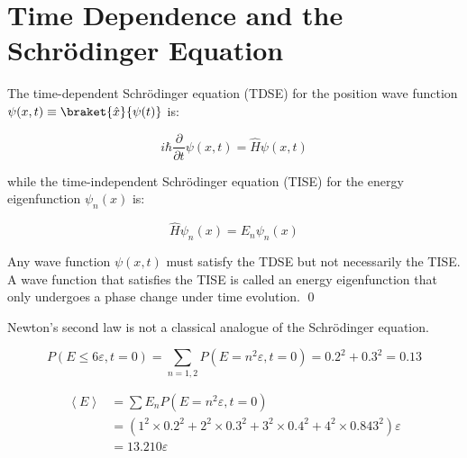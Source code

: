 \documentclass[12pt]{article}
\begin{document}



\pagebreak
\section*{Time Dependence and the Schr\"odinger Equation}


The time-dependent Schr\"odinger equation (TDSE) for the position wave function $\psi(x,t) \equiv \braket{\hat{x}}{\psi(t)}$ is:

\begin{equation}
    i\hbar \frac{\partial}{\partial t} \psi(x,t) = \hat{H} \psi(x,t)
\end{equation}

while the time-independent Schr\"odinger equation (TISE) for the energy eigenfunction $\psi_{n}(x)$ is:

\begin{equation}
    \hat{H} \psi_{n}(x) = E_{n} \psi_{n}(x)
\end{equation}

Any wave function $\psi(x,t)$ must satisfy the TDSE but not necessarily the TISE. A wave function that satisfies the TISE is called an energy eigenfunction that only undergoes a phase change under time evolution.
\qed


\begin{correction}
    Newton's second law is not a classical analogue of the Schr\"odinger equation.
\end{correction}




\begin{equation}
    P(E \le 6\varepsilon, t = 0) = \sum_{n = 1, 2} P(E = n^{2}\varepsilon, t = 0) = 0.2^{2} + 0.3^{2} = 0.13
\end{equation}


\begin{equation}
    \begin{split}
        \left\langle E \right\rangle &= \sum E_{n} P(E = n^{2}\varepsilon, t = 0) \\
        &= \left( 1^{2} \times 0.2^{2} + 2^{2} \times 0.3^{2} + 3^{2} \times 0.4^{2} + 4^{2} \times 0.843^{2} \right) \varepsilon \\
        &= 13.210 \varepsilon
    \end{split}
\end{equation}
\end{document}

